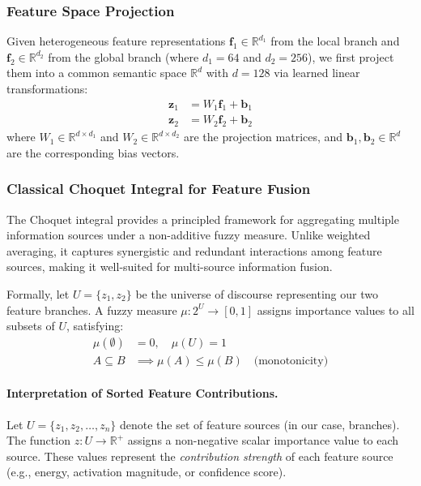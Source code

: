 \documentclass[12pt]{article}
\begin{document}
\subsubsection{Feature Space Projection}

Given heterogeneous feature representations $\mathbf{f}_1 \in \mathbb{R}^{d_1}$ from the local branch and $\mathbf{f}_2 \in \mathbb{R}^{d_2}$ from the global branch (where $d_1 = 64$ and $d_2 = 256$), we first project them into a common semantic space $\mathbb{R}^d$ with $d = 128$ via learned linear transformations:
\begin{align*}
    \mathbf{z}_1 &= W_1 \mathbf{f}_1 + \mathbf{b}_1 \\
    \mathbf{z}_2 &= W_2 \mathbf{f}_2 + \mathbf{b}_2
\end{align*}
where $W_1 \in \mathbb{R}^{d \times d_1}$ and $W_2 \in \mathbb{R}^{d \times d_2}$ are the projection matrices, and $\mathbf{b}_1, \mathbf{b}_2 \in \mathbb{R}^d$ are the corresponding bias vectors.

\subsubsection{Classical Choquet Integral for Feature Fusion}

The Choquet integral provides a principled framework for aggregating multiple information sources under a non-additive fuzzy measure. Unlike weighted averaging, it captures synergistic and redundant interactions among feature sources, making it well-suited for multi-source information fusion.

Formally, let $U = \{z_1, z_2\}$ be the universe of discourse representing our two feature branches. A fuzzy measure $\mu: 2^U \rightarrow [0,1]$ assigns importance values to all subsets of $U$, satisfying:
\begin{align*}
    \mu(\emptyset) &= 0, \quad \mu(U) = 1 \\
    A \subseteq B &\implies \mu(A) \leq \mu(B) \quad \text{(monotonicity)}
\end{align*}

\paragraph{Interpretation of Sorted Feature Contributions.}

Let $U = \{z_1, z_2, \ldots, z_n\}$ denote the set of feature sources (in our case, branches). 
The function $z: U \rightarrow \mathbb{R}^+$ assigns a non-negative scalar importance value 
to each source. These values represent the \emph{contribution strength} of each feature source 
(e.g., energy, activation magnitude, or confidence score).
\end{document}
